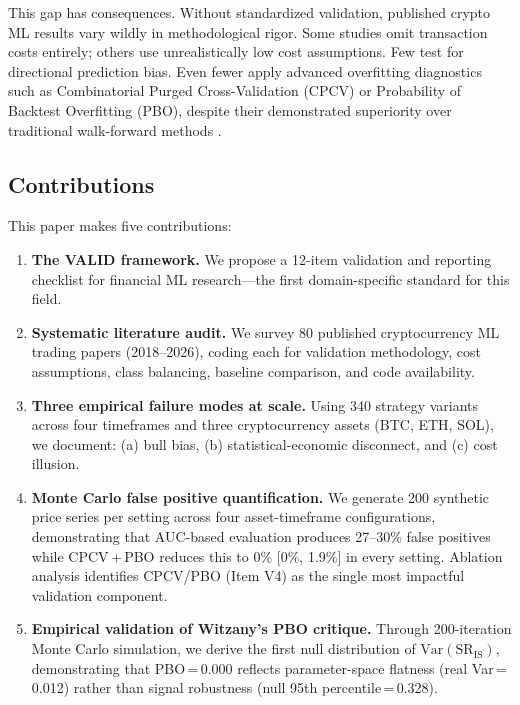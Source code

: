 \documentclass[preprint,12pt,authoryear]{elsarticle}
\begin{document}
This gap has consequences. Without standardized validation, published crypto ML results vary wildly in methodological rigor. Some studies omit transaction costs entirely; others use unrealistically low cost assumptions. Few test for directional prediction bias. Even fewer apply advanced overfitting diagnostics such as Combinatorial Purged Cross-Validation (CPCV) or Probability of Backtest Overfitting (PBO), despite their demonstrated superiority over traditional walk-forward methods \citep{arian2024backtest}.

\subsection{Contributions}

This paper makes five contributions:

\begin{enumerate}
\item \textbf{The VALID framework.} We propose a 12-item validation and reporting checklist for financial ML research---the first domain-specific standard for this field.

\item \textbf{Systematic literature audit.} We survey 80 published cryptocurrency ML trading papers (2018--2026), coding each for validation methodology, cost assumptions, class balancing, baseline comparison, and code availability.

\item \textbf{Three empirical failure modes at scale.} Using 340 strategy variants across four timeframes and three cryptocurrency assets (BTC, ETH, SOL), we document: (a) bull bias, (b) statistical-economic disconnect, and (c) cost illusion.

\item \textbf{Monte Carlo false positive quantification.} We generate 200 synthetic price series per setting across four asset-timeframe configurations, demonstrating that AUC-based evaluation produces 27--30\% false positives while CPCV\,+\,PBO reduces this to 0\% [0\%, 1.9\%] in every setting. Ablation analysis identifies CPCV/PBO (Item V4) as the single most impactful validation component.

\item \textbf{Empirical validation of Witzany's PBO critique.} Through 200-iteration Monte Carlo simulation, we derive the first null distribution of $\mathrm{Var}(\mathrm{SR}_{\mathrm{IS}})$, demonstrating that PBO\,=\,0.000 reflects parameter-space flatness (real Var\,=\,0.012) rather than signal robustness (null 95th percentile\,=\,0.328).
\end{enumerate}
\end{document}
